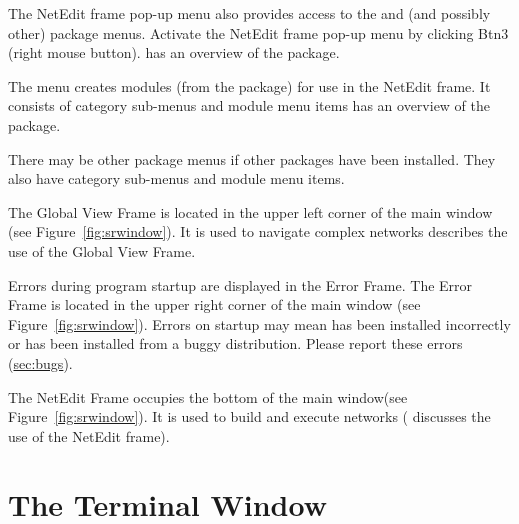 \begin{description}
\begin{description}
    The NetEdit frame pop-up menu  also
    provides access to the \menu{\sr{}} and \menu{\biopse{}} (and
    possibly other) package menus. Activate the NetEdit frame pop-up
    menu by clicking Btn3 (right mouse button).  has an overview of the
    \sr{} package.
  \end{description}

  \begin{description}
     The  menu creates modules (from the
    \biopse package) for use in the NetEdit frame.  It consists of
    category sub-menus and module menu items  has an overview of the \biopse{}package.
  \end{description}

  \begin{description}
     There may be other
    package menus if other packages have been installed.  They also
    have category sub-menus and module menu items.
  \end{description}
  
   The Global View Frame is located in the
  upper left corner of the main window (see
  Figure~\ref{fig:srwindow}). It is used to navigate complex networks
   describes the use of the Global View Frame.
  
   Errors during program startup are displayed
  in the Error Frame.  The Error Frame is located in the upper right
  corner of the main window (see Figure~\ref{fig:srwindow}).  Errors on
  startup may mean \sr{} has been installed incorrectly or has
  been installed from a buggy distribution.  Please report these
  errors (\hyperref{report}{see Section~}{)}{sec:bugs}).
  
   The NetEdit Frame occupies the bottom of
  the main window(see Figure~\ref{fig:srwindow}).  It is used to build
  and execute networks (
  discusses the use of the NetEdit frame).

\end{description}

\section{The Terminal Window}
\label{sec:termwinapp}


